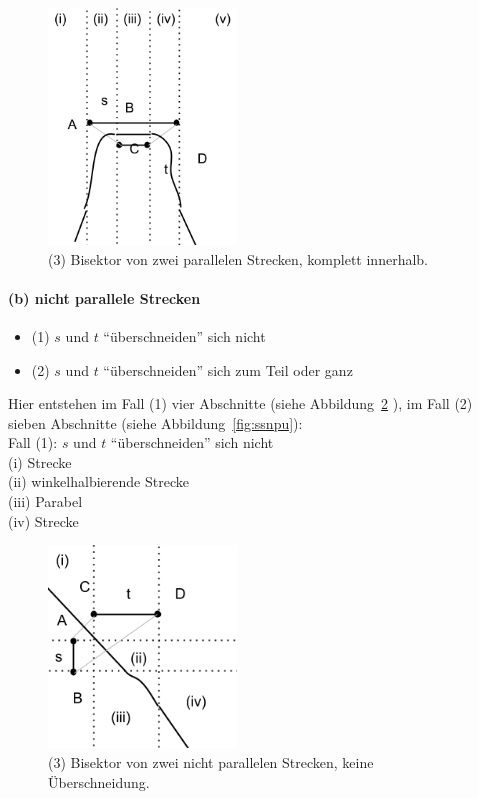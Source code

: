 \begin{figure}[h]
\begin{center}
\includegraphics[width=5cm]{img/ss4.png}
\end{center}
\caption{(3) Bisektor von zwei parallelen Strecken, komplett innerhalb.}
\label{fig:sspua}
\end{figure}

\newpage

\paragraph*{(b) nicht parallele Strecken}

\begin{itemize}
\item (1) $s$ und $t$ "`überschneiden"' sich nicht
\item (2) $s$ und $t$ "`überschneiden"' sich zum Teil oder ganz
\end{itemize}

Hier entstehen im Fall (1) vier Abschnitte (siehe Abbildung~\ref{fig:ssnpku} ), im Fall (2) sieben Abschnitte (siehe Abbildung~\ref{fig:ssnpu}):\\

Fall (1): $s$ und $t$ "`überschneiden"' sich nicht\\
(i) Strecke\\
(ii) winkelhalbierende Strecke\\
(iii) Parabel\\
(iv) Strecke\\

\begin{figure}[h!]
\begin{center}
\includegraphics[width=5cm]{img/ssnpout.png}
\end{center}
\caption{(3) Bisektor von zwei nicht parallelen Strecken, keine Überschneidung.}
\label{fig:ssnpku}
\end{figure}

